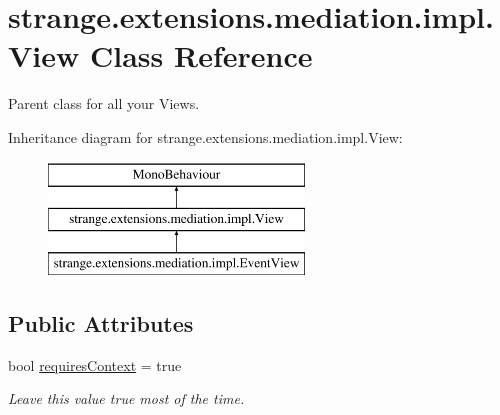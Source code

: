 \hypertarget{classstrange_1_1extensions_1_1mediation_1_1impl_1_1_view}{\section{strange.\-extensions.\-mediation.\-impl.\-View Class Reference}
\label{classstrange_1_1extensions_1_1mediation_1_1impl_1_1_view}
}


Parent class for all your Views.  


Inheritance diagram for strange.\-extensions.\-mediation.\-impl.\-View\-:\begin{figure}[H]
\begin{center}
\leavevmode
\includegraphics[height=3.000000cm]{classstrange_1_1extensions_1_1mediation_1_1impl_1_1_view}
\end{center}
\end{figure}
\subsection*{Public Attributes}
\begin{DoxyCompactItemize}
\item 
bool \hyperlink{classstrange_1_1extensions_1_1mediation_1_1impl_1_1_view_ad830e5b03b04691f18ea3fe83a6b2a6d}{requires\-Context} = true
\begin{DoxyCompactList}\small\item\em Leave this value true most of the time. \end{DoxyCompactList}\end{DoxyCompactItemize}
